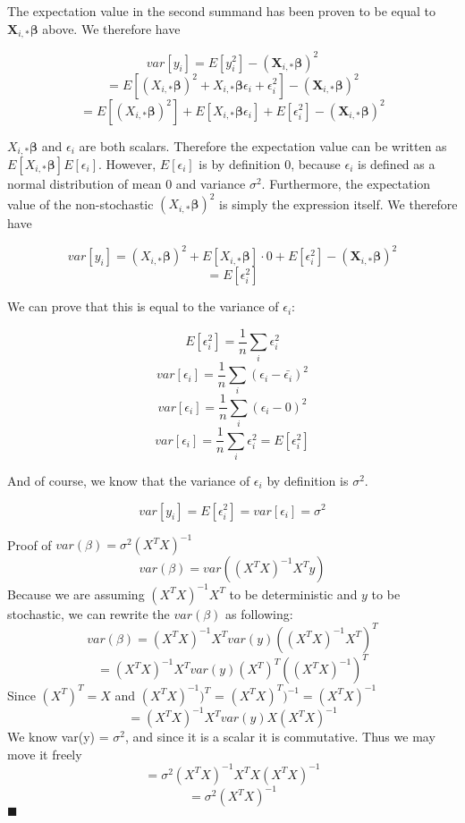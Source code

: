 \documentclass{article}
\begin{document}
The expectation value in the second summand has been proven to be equal 
to $\bm{X}_{i,*}\bm{\beta}$ above. We therefore have

\[ var[y_i] = E[y_i^2] - (\bm{X}_{i,*}\bm{\beta})^2 \]
\[ = E\left[(X_{i,*}\bm{\beta})^2 + X_{i,*}\bm{\beta}\epsilon_i + \epsilon_i^2\right] - (\bm{X}_{i,*}\bm{\beta})^2 \]
\[ = E\left[(X_{i,*}\bm{\beta})^2\right] + E[X_{i,*}\bm{\beta}\epsilon_i] + E[\epsilon_i^2] - (\bm{X}_{i,*}\bm{\beta})^2 \]

$X_{i,*}\bm{\beta}$ and $\epsilon_i$ are both scalars. Therefore the expectation value can be written as
$E[X_{i,*}\bm{\beta}]E[\epsilon_i]$. However, $E[\epsilon_i]$ is by definition $0$, because $\epsilon_i$ is
defined as a normal distribution of mean $0$ and variance $\sigma^2$. Furthermore, the expectation value of the
non-stochastic $(X_{i,*}\bm{\beta})^2$ is simply the expression itself. We therefore have

\[ var[y_i] = (X_{i,*}\bm{\beta})^2 + E[X_{i,*}\bm{\beta}]\cdot 0 + E[\epsilon_i^2] - (\bm{X}_{i,*}\bm{\beta})^2 \]
\[ = E[\epsilon_i^2] \]

We can prove that this is equal to the variance of $\epsilon_i$:

\[ E[\epsilon_i^2] = \frac{1}{n} \sum_i \epsilon_i^2\]
\[ var[\epsilon_i] = \frac{1}{n} \sum_i (\epsilon_i - \bar{\epsilon_i})^2\]
\[ var[\epsilon_i] = \frac{1}{n} \sum_i (\epsilon_i - 0)^2\]
\[ var[\epsilon_i] = \frac{1}{n} \sum_i \epsilon_i^2 = E[\epsilon_i^2] \]

And of course, we know that the variance of $\epsilon_i$ by definition is $\sigma^2$.

\[ var[y_i] = E[\epsilon_i^2] = var[\epsilon_i] = \sigma^2 \]


Proof of $var(\beta) = \sigma^{2}(X^{T}X)^{-1}$
$$var(\beta) = var((X^{T}X)^{-1}X^{T}y)$$
Because we are assuming $(X^{T}X)^{-1}X^{T}$ to be deterministic and $y$ to be stochastic, we can rewrite the $var(\beta)$ as following:
$$var(\beta) = (X^{T}X)^{-1}X^{T}var(y)((X^{T}X)^{-1}X^{T})^{T}$$
$$ = (X^{T}X)^{-1}X^{T}var(y)(X^{T})^{T}((X^{T}X)^{-1})^{T}$$
Since $(X^{T})^{T} = X$ and $(X^{T}X)^{-1})^{T}$ = $(X^{T}X)^{T})^{-1} = (X^{T}X)^{-1}$
$$ = (X^{T}X)^{-1}X^{T}var(y)X(X^{T}X)^{-1} $$
We know var(y) = $\sigma^{2}$, and since it is a scalar it is commutative. Thus we may move it freely
$$ = \sigma^{2}(X^{T}X)^{-1}X^{T}X(X^{T}X)^{-1} $$
$$ = \sigma^{2}(X^{T}X)^{-1} $$
$\blacksquare$
\end{document}
